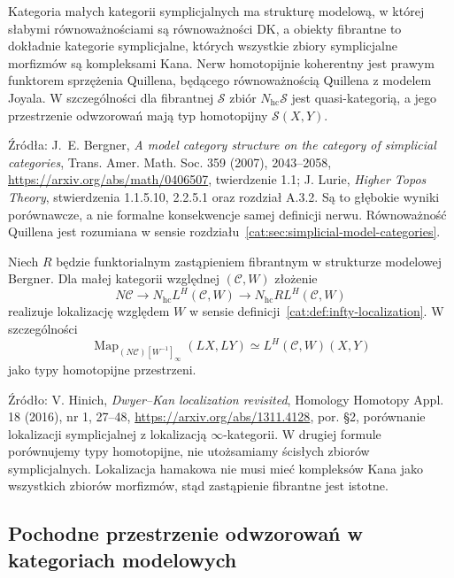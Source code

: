 \begin{twierdzenie}\label{cat:thm:dk-bergner}
Kategoria małych kategorii symplicjalnych ma strukturę modelową, w której słabymi równoważnościami są równoważności DK, a obiekty fibrantne to dokładnie kategorie symplicjalne, których wszystkie zbiory symplicjalne morfizmów są kompleksami Kana. Nerw homotopijnie koherentny jest prawym funktorem sprzężenia Quillena, będącego równoważnością Quillena z modelem Joyala. W szczególności dla fibrantnej $\mathcal S$ zbiór $N_{\mathrm{hc}}\mathcal S$ jest quasi-kategorią, a jego przestrzenie odwzorowań mają typ homotopijny $\mathcal S(X,Y)$.
\end{twierdzenie}

Źródła: J.~E. Bergner, \emph{A model category structure on the category of simplicial categories}, Trans. Amer. Math. Soc. 359 (2007), 2043--2058, \url{https://arxiv.org/abs/math/0406507}, twierdzenie 1.1; J. Lurie, \emph{Higher Topos Theory}, stwierdzenia 1.1.5.10, 2.2.5.1 oraz rozdział A.3.2. Są to głębokie wyniki porównawcze, a nie formalne konsekwencje samej definicji nerwu. Równoważność Quillena jest rozumiana w sensie rozdziału~\ref{cat:sec:simplicial-model-categories}.

\begin{twierdzenie}\label{cat:thm:dk-infty-comparison}
Niech $R$ będzie funktorialnym zastąpieniem fibrantnym w strukturze modelowej Bergner. Dla małej kategorii względnej $(\mathcal C,W)$ złożenie
\[
 N\mathcal C\longrightarrow N_{\mathrm{hc}}L^H(\mathcal C,W)
 \longrightarrow N_{\mathrm{hc}}RL^H(\mathcal C,W)
\]
realizuje lokalizację względem $W$ w sensie definicji~\ref{cat:def:infty-localization}. W szczególności
\[
 \operatorname{Map}_{(N\mathcal C)[W^{-1}]_\infty}(LX,LY)
 \simeq L^H(\mathcal C,W)(X,Y)
\]
jako typy homotopijne przestrzeni.
\end{twierdzenie}

Źródło: V. Hinich, \emph{Dwyer--Kan localization revisited}, Homology Homotopy Appl. 18 (2016), nr 1, 27--48, \url{https://arxiv.org/abs/1311.4128}, por. \S2, porównanie lokalizacji symplicjalnej z lokalizacją $\infty$-kategorii. W drugiej formule porównujemy typy homotopijne, nie utożsamiamy ścisłych zbiorów symplicjalnych. Lokalizacja hamakowa nie musi mieć kompleksów Kana jako wszystkich zbiorów morfizmów, stąd zastąpienie fibrantne jest istotne.

\subsection{Pochodne przestrzenie odwzorowań w kategoriach modelowych}

